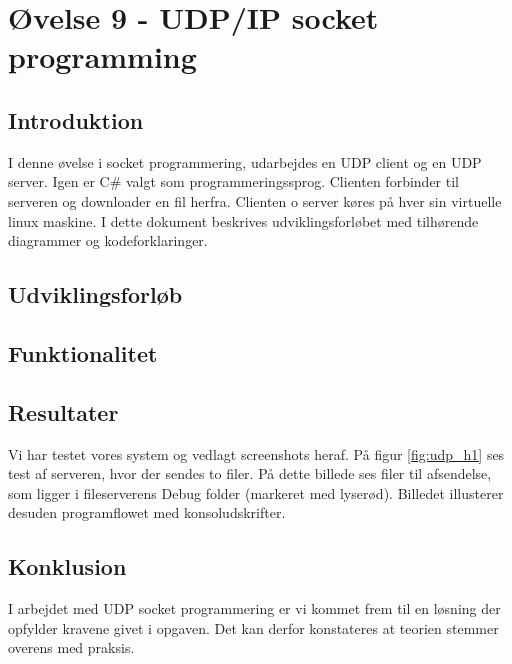 \section{Øvelse 9 - UDP/IP socket programming}

\subsection{Introduktion}
I denne øvelse i socket programmering, udarbejdes en UDP client og en UDP server. Igen er C\# valgt som programmeringssprog. Clienten forbinder til serveren og downloader en fil herfra. Clienten o server køres på hver sin virtuelle linux maskine. I dette dokument beskrives udviklingsforløbet med tilhørende diagrammer og kodeforklaringer.

\subsection{Udviklingsforløb}

\subsection{Funktionalitet}

\subsection{Resultater}
Vi har testet vores system og vedlagt screenshots heraf. På figur \ref{fig:udp_h1} ses test af serveren, hvor der sendes to filer. På dette billede ses filer til afsendelse, som ligger i fileserverens Debug folder (markeret med lyserød). Billedet illusterer desuden programflowet med konsoludskrifter.

\subsection{Konklusion}
I arbejdet med UDP socket programmering er vi kommet frem til en løsning der opfylder kravene givet i opgaven. Det kan derfor konstateres at teorien stemmer overens med praksis.